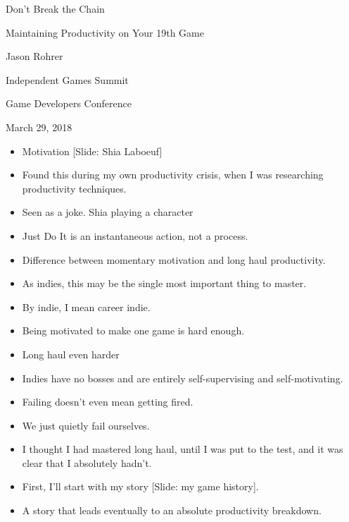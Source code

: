 \documentclass[12pt]{article}
\begin{document}
\begin{center}
Don't Break the Chain

Maintaining Productivity on Your 19th Game 

Jason Rohrer

Independent Games Summit

Game Developers Conference 

March 29, 2018
\end{center}


{\Huge



\begin{itemize}

\item Motivation [Slide:  Shia Laboeuf]

\item Found this during my own productivity crisis, when I was researching productivity techniques.

\item Seen as a joke.  Shia playing a character

\item Just Do It is an instantaneous action, not a process.

\item Difference between momentary motivation and long haul productivity.

\item As indies, this may be the single most important thing to master.

\item By indie, I mean career indie.

\item Being motivated to make one game is hard enough.

\item Long haul even harder

\item Indies have no bosses and are entirely self-supervising and self-motivating.

\item Failing doesn't even mean getting fired.  

\item We just quietly fail ourselves.

\item I thought I had mastered long haul, until I was put to the test, and it was clear that I absolutely hadn't.

\item First, I'll start with my story [Slide:  my game history].

\item A story that leads eventually to an absolute productivity breakdown.



\end{itemize}

}
\end{document}
